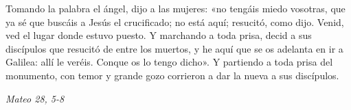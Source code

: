 \documentclass[../../devocionario.tex]{subfiles}
\begin{document}
    Tomando la palabra el ángel, dijo a las mujeres: «no tengáis miedo vosotras, que ya sé que buscáis a Jesús el crucificado; 
    no está aquí; resucitó, como dijo. Venid, ved el lugar donde estuvo puesto. Y marchando a toda prisa, 
    decid a sus discípulos que resucitó de entre los muertos, y he aquí que se os adelanta en ir a Galilea: allí le veréis. 
    Conque os lo tengo dicho». Y partiendo a toda prisa del monumento, con temor y grande gozo corrieron a dar la nueva a sus discípulos. 

    \begin{flushright}
        \emph{Mateo 28, 5-8}
    \end{flushright}
\end{document}
